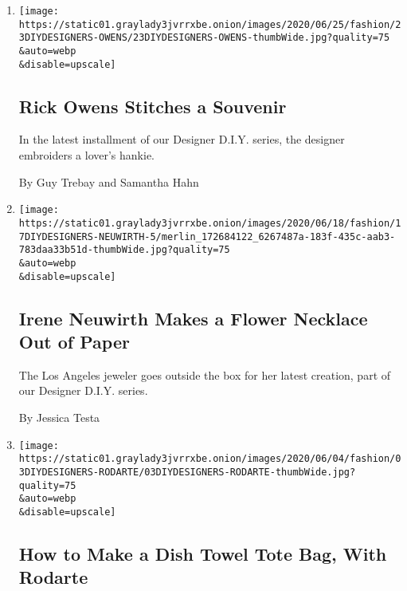 \begin{enumerate}
\def\labelenumi{\arabic{enumi}.}
\item
  \href{/2020/06/23/style/DIY-sewing-rick-owens-stitches-a-souvenir.html}{}

  \texttt{[image: https://static01.graylady3jvrrxbe.onion/images/2020/06/25/fashion/23DIYDESIGNERS-OWENS/23DIYDESIGNERS-OWENS-thumbWide.jpg?quality=75\\\&auto=webp\\\&disable=upscale]}

  \hypertarget{rick-owens-stitches-a-souvenir}{%
  \subsection{Rick Owens Stitches a
  Souvenir}\label{rick-owens-stitches-a-souvenir}}

  In the latest installment of our Designer D.I.Y. series, the designer
  embroiders a lover's hankie.

  By Guy Trebay and Samantha Hahn
\item
  \href{/2020/06/17/style/paper-flower-necklace-DIY.html}{}

  \texttt{[image: https://static01.graylady3jvrrxbe.onion/images/2020/06/18/fashion/17DIYDESIGNERS-NEUWIRTH-5/merlin\_172684122\_6267487a-183f-435c-aab3-783daa33b51d-thumbWide.jpg?quality=75\\\&auto=webp\\\&disable=upscale]}

  \hypertarget{irene-neuwirth-makes-a-flower-necklace-out-of-paper}{%
  \subsection{Irene Neuwirth Makes a Flower Necklace Out of
  Paper}\label{irene-neuwirth-makes-a-flower-necklace-out-of-paper}}

  The Los Angeles jeweler goes outside the box for her latest creation,
  part of our Designer D.I.Y. series.

  By Jessica Testa
\item
  \href{/2020/06/02/style/dish-towel-tote-bag.html}{}

  \texttt{[image: https://static01.graylady3jvrrxbe.onion/images/2020/06/04/fashion/03DIYDESIGNERS-RODARTE/03DIYDESIGNERS-RODARTE-thumbWide.jpg?quality=75\\\&auto=webp\\\&disable=upscale]}

  \hypertarget{how-to-make-a-dish-towel-tote-bag-with-rodarte}{%
  \subsection{How to Make a Dish Towel Tote Bag, With
  Rodarte}\label{how-to-make-a-dish-towel-tote-bag-with-rodarte}}


\end{enumerate}
